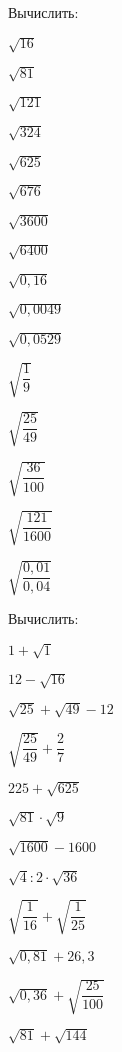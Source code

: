 %
%
\begin{class}[number=2]
	\begin{listofex}
		\item Вычислить: 
		\begin{enumcols}[itemcolumns=4]
			\item \( \sqrt{16} \)
			\item \( \sqrt{81} \)
			\item \( \sqrt{121} \)
			\item \( \sqrt{324} \)
			\item \( \sqrt{625} \)
			\item \( \sqrt{676} \)
			\item \( \sqrt{3600} \)
			\item \( \sqrt{6400} \)
			\item \( \sqrt{0,16} \)
			\item \( \sqrt{0,0049} \)
			\item \( \sqrt{0,0529} \)
			\item \( \sqrt{\dfrac{1}{9}} \)
			\item \( \sqrt{\dfrac{25}{49}} \)
			\item \( \sqrt{\dfrac{36}{100}} \)
			\item \( \sqrt{\dfrac{121}{1600}} \)
			\item \( \sqrt{\dfrac{0,01}{0,04}} \)
		\end{enumcols}
		\item Вычислить:
		\begin{enumcols}[itemcolumns=4]
			\item \( 1+\sqrt{1} \)
			\item \( 12-\sqrt{16} \)
			\item \( \sqrt{25}+\sqrt{49}-12 \)
			\item \( \sqrt{\dfrac{25}{49}}+\dfrac{2}{7} \)
			\item \( 225+\sqrt{625} \)
			\item \( \sqrt{81}\cdot\sqrt{9} \)
			\item \( \sqrt{1600}-1600 \)
			\item \( \sqrt{4}:2\cdot\sqrt{36} \)
			\item \( \sqrt{\dfrac{1}{16}}+\sqrt{\dfrac{1}{25}}\)
			\item \( \sqrt{0,81}+26,3 \)
			\item \( \sqrt{0,36}+\sqrt{\dfrac{25}{100}} \)
			\item \( \sqrt{81}+\sqrt{144} \)
		\end{enumcols}

\end{listofex}
\end{class}
